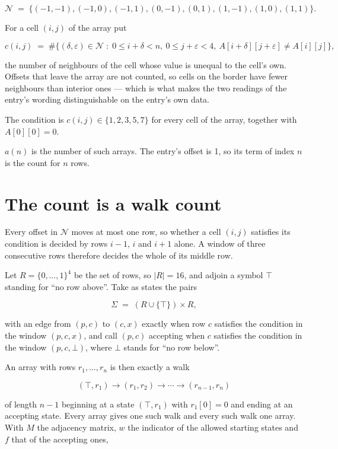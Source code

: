 \documentclass[11pt]{article}
\theoremstyle{definition}
\begin{document}
\[\mathcal{N} \;=\; \{(-1,-1), (-1,0), (-1,1), (0,-1), (0,1), (1,-1), (1,0), (1,1)\}.\]

For a cell $(i,j)$ of the array put

\[c(i,j) \;=\; \#\bigl\{(\delta,\varepsilon)\in\mathcal{N} \;:\; 0\le i+\delta<n,\ 0\le j+\varepsilon<4,\ A[i+\delta][j+\varepsilon] \neq A[i][j]\bigr\},\]

the number of neighbours of the cell whose value is unequal to the cell's own. Offsets that leave the array are not counted, so cells on the border have fewer neighbours than interior ones --- which is what makes the two readings of the entry's wording distinguishable on the entry's own data.

The condition is $c(i,j) \in \{1, 2, 3, 5, 7\}$ for every cell of the array, together with $A[0][0]=0$.

$a(n)$ is the number of such arrays. The entry's offset is 1, so its term of index $n$ is the count for $n$ rows.

\section{The count is a walk count}

Every offset in $\mathcal{N}$ moves at most one row, so whether a cell $(i,j)$ satisfies its condition is decided by rows $i-1$, $i$ and $i+1$ alone. A window of three consecutive rows therefore decides the whole of its middle row.

Let $R = \{0,\dots,1\}^{4}$ be the set of rows, so $|R| = 16$, and adjoin a symbol $\top$ standing for ``no row above''. Take as states the pairs

\[\Sigma \;=\; (R \cup \{\top\}) \times R,\]

with an edge from $(p,c)$ to $(c,x)$ exactly when row $c$ satisfies the condition in the window $(p,c,x)$, and call $(p,c)$ accepting when $c$ satisfies the condition in the window $(p,c,\bot)$, where $\bot$ stands for ``no row below''.

An array with rows $r_1,\dots,r_n$ is then exactly a walk

\[(\top,r_1) \to (r_1,r_2) \to \cdots \to (r_{n-1},r_n)\]

of length $n-1$ beginning at a state $(\top,r_1)$ with $r_1[0]=0$ and ending at an accepting state. Every array gives one such walk and every such walk one array. With $M$ the adjacency matrix, $w$ the indicator of the allowed starting states and $f$ that of the accepting ones,
\end{document}
